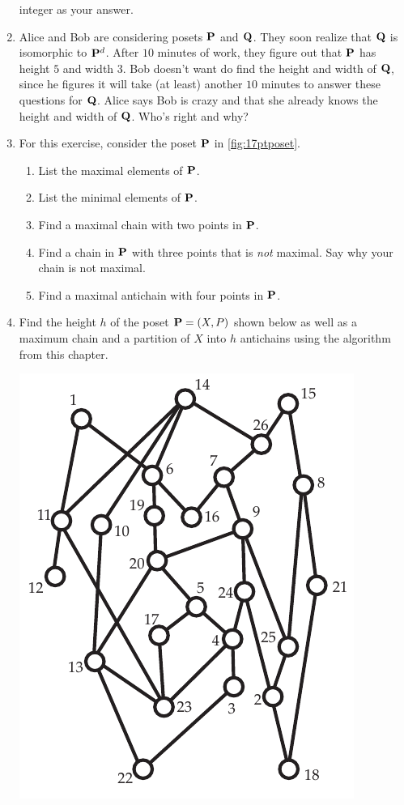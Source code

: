 \begin{enumerate}
  integer as your answer.
\item Alice and Bob are considering posets $\mathbf{P}$ and $\mathbf{Q}$. They
  soon realize that $\mathbf{Q}$ is isomorphic to $\mathbf{P}^d$. After $10$
  minutes of work, they figure out that $\mathbf{P}$ has height $5$ and
  width $3$. Bob doesn't want do find the height and width of $\mathbf{Q}$,
  since he figures it will take (at least) another $10$ minutes to
  answer these questions for $\mathbf{Q}$. Alice says Bob is crazy and that
  she already knows the height and width of $\mathbf{Q}$. Who's right and
  why?  
\item For this exercise, consider the poset $\mathbf{P}$ in \autoref{fig:17ptposet}.
  \begin{enumerate}
  \item List the maximal elements of $\mathbf{P}$.
  \item List the minimal elements of $\mathbf{P}$.
  \item Find a maximal chain with two points in $\mathbf{P}$.
  \item Find a chain in $\mathbf{P}$ with three points that is \emph{not}
    maximal. Say why your chain is not maximal.
  \item Find a maximal antichain with four points in $\mathbf{P}$.
  \end{enumerate}
\item Find the height $h$ of the poset $\mathbf{P}=(X,P)$ shown below as well as a
  maximum chain and a partition of $X$ into $h$ antichains using the
  algorithm from this chapter.
  \begin{center}
    \includegraphics{posets-figs/height_ex_poset}

\end{center}
\end{enumerate}
